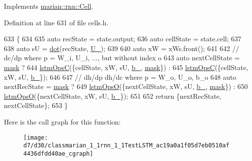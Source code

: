 Implements \hyperlink{classmarian_1_1rnn_1_1Cell_a4bd1bce7cf42fcc48387488e218af257}{marian\+::rnn\+::\+Cell}.



Definition at line 631 of file cells.\+h.


\begin{DoxyCode}
633                                            \{
634 
635     \textcolor{keyword}{auto} recState = state.output;
636     \textcolor{keyword}{auto} cellState = state.cell;
637 
638     \textcolor{keyword}{auto} sU = \hyperlink{namespacemarian_ad7fbf1ba8e2e04ffdc7d5e4841b5e691}{dot}(recState, \hyperlink{classmarian_1_1rnn_1_1TestLSTM_aea81b51a3f0af12142e2f805d2dfb98b}{U\_});
639 
640     \textcolor{keyword}{auto} xW = xWs.front();
641 
642     \textcolor{comment}{// dc/dp where p = W\_i, U\_i, ..., but without index o}
643     \textcolor{keyword}{auto} nextCellState = \hyperlink{namespacemarian_1_1keywords_a201bea6bea8108889b63081132cc3cd7}{mask} ?
644       \hyperlink{namespacemarian_1_1rnn_a0704350093b1deda5d7b5aaef99a9c71}{lstmOpsC}(\{cellState, xW, sU, \hyperlink{classmarian_1_1rnn_1_1TestLSTM_a42841212d517619b37559870c0d65ed1}{b\_}, \hyperlink{namespacemarian_1_1keywords_a201bea6bea8108889b63081132cc3cd7}{mask}\}) :
645       \hyperlink{namespacemarian_1_1rnn_a0704350093b1deda5d7b5aaef99a9c71}{lstmOpsC}(\{cellState, xW, sU, \hyperlink{classmarian_1_1rnn_1_1TestLSTM_a42841212d517619b37559870c0d65ed1}{b\_}\});
646 
647     \textcolor{comment}{// dh/dp dh/dc where p = W\_o, U\_o, b\_o}
648     \textcolor{keyword}{auto} nextRecState = \hyperlink{namespacemarian_1_1keywords_a201bea6bea8108889b63081132cc3cd7}{mask} ?
649       \hyperlink{namespacemarian_1_1rnn_a8ab210a35f8c3fa6c4872689ec45295e}{lstmOpsO}(\{nextCellState, xW, sU, \hyperlink{classmarian_1_1rnn_1_1TestLSTM_a42841212d517619b37559870c0d65ed1}{b\_}, \hyperlink{namespacemarian_1_1keywords_a201bea6bea8108889b63081132cc3cd7}{mask}\}) :
650       \hyperlink{namespacemarian_1_1rnn_a8ab210a35f8c3fa6c4872689ec45295e}{lstmOpsO}(\{nextCellState, xW, sU, \hyperlink{classmarian_1_1rnn_1_1TestLSTM_a42841212d517619b37559870c0d65ed1}{b\_}\});
651 
652     \textcolor{keywordflow}{return} \{nextRecState, nextCellState\};
653   \}
\end{DoxyCode}


Here is the call graph for this function\+:
\nopagebreak
\begin{figure}[H]
\begin{center}
\leavevmode
\texttt{[image: d7/d30/classmarian\_1\_1rnn\_1\_1TestLSTM\_ac19a0a1f05d7eb0510af4436dfdd40ae\_cgraph]}
\end{center}
\end{figure}




